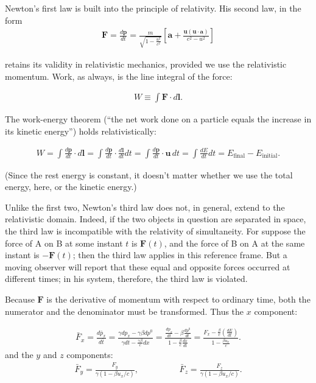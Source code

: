 \documentclass[11pt,letterpaper]{book}
\newcommand{\bm}[1]{\boldsymbol{#1}}
\begin{document}
        Newton’s first law is built into the principle of relativity. His second law, in the form
        \begin{align}
        \bm{F} = \frac{d\bm{p}}{dt} =\frac{m}{\sqrt{1 - \frac{u^2}{c^2}}} \left[ \mathbf{a} + \frac{\mathbf{u}(\mathbf{u} \cdot \mathbf{a})}{c^2 - u^2} \right]
        \end{align}
        
        retains its validity in relativistic mechanics, provided we use the relativistic momentum.
        Work, as always, is the line integral of the force:
        
        \begin{align}
        W \equiv \int \bm{F} \cdot d\bm{l}.
        \end{align}
        
        The work-energy theorem (“the net work done on a particle equals the increase in its kinetic energy”) holds relativistically:
        
        \begin{align}
        W = \int \frac{d\bm{p}}{dt} \cdot d\bm{l} = \int \frac{d\bm{p}}{dt} \cdot \frac{d\bm{l}}{dt} dt = \int \frac{d\bm{p}}{dt} \cdot \bm{u} \, dt= \int \frac{dE}{dt} dt = E_{\text{final}} - E_{\text{initial}}.
        \end{align}
        
        (Since the rest energy is constant, it doesn’t matter whether we use the total energy, here, or the kinetic energy.)
        
        Unlike the first two, Newton’s third law does not, in general, extend to the relativistic domain. Indeed, if the two objects in question are separated in space, the third law is incompatible with the relativity of simultaneity. For suppose the force of A on B at some instant \(t\) is \(\bm{F}(t)\), and the force of B on A at the same instant is \(-\bm{F}(t)\); then the third law applies in this reference frame. But a moving observer will report that these equal and opposite forces occurred at different times; in his system, therefore, the third law is violated.
        
        Because \(\bm{F}\) is the derivative of momentum with respect to ordinary time, both the numerator and the denominator must be transformed. Thus the \(x\) component:
        
        \begin{align}
        \bar{F}_x = \frac{d \bar{p}_x}{d \bar{t}} = \frac{\gamma dp_x - \gamma\beta dp^0}{\gamma dt -  \frac{\gamma\beta}{c} dx} = \frac{\frac{dp_x}{dt} - \beta \frac{ dp^0}{dt}}{1 - \frac{\beta}{c}\frac{dx}{dt}} = \frac{F_x - \frac{\beta}{c}(\frac{dE}{dt})}{1 - \frac{\beta u_x}{c}}.
        \end{align}
        and the \(y\) and \(z\) components:
        \begin{align}
        \bar{F}_y = \frac{F_y}{\gamma (1 - \beta u_x/c)}, \hspace{2cm} \bar{F}_z = \frac{F_z}{\gamma (1 - \beta u_x/c)}. 
        \end{align}      
        
\end{document}
